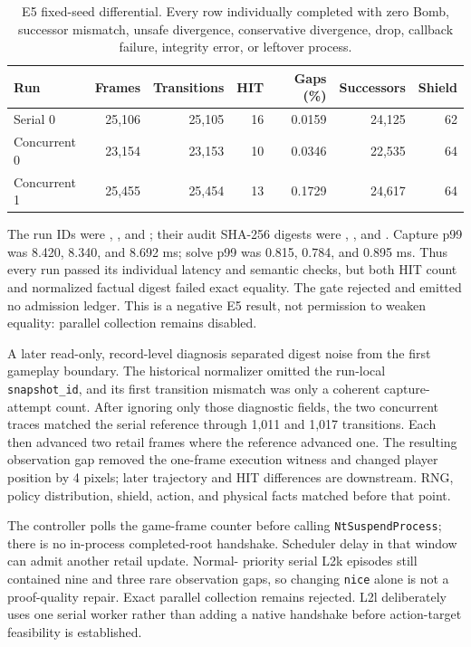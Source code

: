 \documentclass[11pt]{article}
\begin{document}
\begin{table}[ht]
\centering
\small
\begin{tabular}{@{}lrrrrrr@{}}
\toprule
Run & Frames & Transitions & HIT & Gaps (\%) & Successors & Shield \\
\midrule
Serial 0 & 25,106 & 25,105 & 16 & 0.0159 & 24,125 & 62 \\
Concurrent 0 & 23,154 & 23,153 & 10 & 0.0346 & 22,535 & 64 \\
Concurrent 1 & 25,455 & 25,454 & 13 & 0.1729 & 24,617 & 64 \\
\bottomrule
\end{tabular}
\caption{E5 fixed-seed differential.  Every row individually completed with
zero Bomb, successor mismatch, unsafe divergence, conservative divergence,
drop, callback failure, integrity error, or leftover process.}
\label{tab:e5}
\end{table}

The run IDs were ,
, and
; their audit SHA-256 digests were
,
,
and
.
Capture p99 was 8.420, 8.340, and 8.692 ms; solve p99 was 0.815, 0.784,
and 0.895 ms.  Thus every run passed its individual latency and semantic
checks, but both HIT count and normalized factual digest failed exact equality.
The gate rejected  and emitted no admission ledger.
This is a negative E5 result, not permission to weaken equality: parallel
collection remains disabled.

A later read-only, record-level diagnosis separated digest noise from the
first gameplay boundary.  The historical normalizer omitted the run-local
\texttt{snapshot\_id}, and its first transition mismatch was only a coherent
capture-attempt count.  After ignoring only those diagnostic fields, the two
concurrent traces matched the serial reference through 1,011 and 1,017
transitions.  Each then advanced two retail frames where the reference advanced
one.  The resulting observation gap removed the one-frame execution witness
and changed player position by 4 pixels; later trajectory and HIT differences
are downstream.  RNG, policy distribution, shield, action, and physical facts
matched before that point.

The controller polls the game-frame counter before calling
\texttt{NtSuspendProcess}; there is no in-process completed-root handshake.
Scheduler delay in that window can admit another retail update.  Normal-
priority serial L2k episodes still contained nine and three rare observation
gaps, so changing \texttt{nice} alone is not a proof-quality repair.  Exact
parallel collection remains rejected.  L2l deliberately uses one serial worker
rather than adding a native handshake before action-target feasibility is
established.
\end{document}
